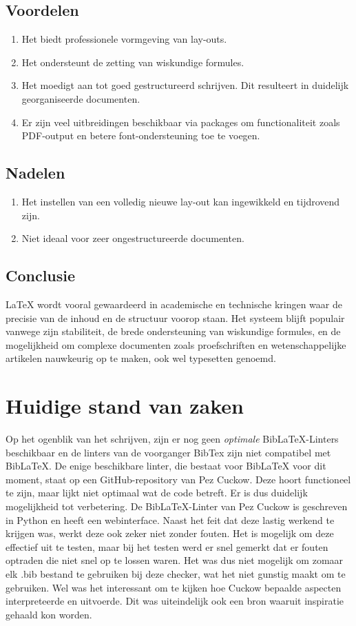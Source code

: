 \subsection{Voordelen}
\begin{enumerate}
    \item Het biedt professionele vormgeving van lay-outs.
    \item Het ondersteunt de zetting van wiskundige formules.
    \item Het moedigt aan tot goed gestructureerd schrijven. Dit resulteert in duidelijk georganiseerde documenten.
    \item Er zijn veel uitbreidingen beschikbaar via packages om functionaliteit zoals PDF-output en betere font-ondersteuning toe te voegen.
\end{enumerate}

\subsection{Nadelen}
\begin{enumerate}
    \item Het instellen van een volledig nieuwe lay-out kan ingewikkeld en tijdrovend zijn.
    \item Niet ideaal voor zeer ongestructureerde documenten.
\end{enumerate}

\subsection{Conclusie}
LaTeX wordt vooral gewaardeerd in academische en technische kringen waar de precisie van de inhoud en de structuur voorop staan. Het systeem blijft populair vanwege zijn stabiliteit, de brede ondersteuning van wiskundige formules, en de mogelijkheid om complexe documenten zoals proefschriften en wetenschappelijke artikelen nauwkeurig op te maken, ook wel typesetten genoemd. \autocite{Oetiker2023}

\section{Huidige stand van zaken}
Op het ogenblik van het schrijven, zijn er nog geen \emph{optimale} BibLaTeX-Linters beschikbaar en de linters van de voorganger BibTex zijn niet compatibel met BibLaTeX. De enige beschikbare linter, die bestaat voor BibLaTeX voor dit moment, staat op een GitHub-repository van Pez Cuckow. Deze hoort functioneel te zijn, maar lijkt niet optimaal wat de code betreft. Er is dus duidelijk mogelijkheid tot verbetering. De BibLaTeX-Linter van Pez Cuckow is geschreven in Python en heeft een webinterface.\autocite{Cuckow2022} Naast het feit dat deze lastig werkend te krijgen was, werkt deze ook zeker niet zonder fouten. Het is mogelijk om deze effectief uit te testen, maar bij het testen werd er snel gemerkt dat er fouten optraden die niet snel op te lossen waren. Het was dus niet mogelijk om zomaar elk .bib bestand te gebruiken bij deze checker, wat het niet gunstig maakt om te gebruiken. Wel was het interessant om te kijken hoe Cuckow bepaalde aspecten interpreteerde en uitvoerde. Dit was uiteindelijk ook een bron waaruit inspiratie gehaald kon worden.

